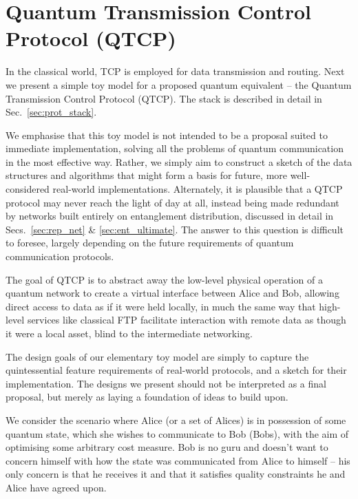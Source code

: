 %
%

\section{Quantum Transmission Control Protocol (QTCP)} \label{sec:QTCP}

In the classical world, TCP is employed for data transmission and routing. Next we present a simple toy model for a proposed quantum equivalent -- the Quantum Transmission Control Protocol (QTCP). The stack is described in detail in Sec.~\ref{sec:prot_stack}.

We emphasise that this toy model is not intended to be a proposal suited to immediate implementation, solving all the problems of quantum communication in the most effective way. Rather, we simply aim to construct a sketch of the data structures and algorithms that might form a basis for future, more well-considered real-world implementations. Alternately, it is plausible that a QTCP protocol may never reach the light of day at all, instead being made redundant by networks built entirely on entanglement distribution, discussed in detail in Secs.~\ref{sec:rep_net} \& \ref{sec:ent_ultimate}. The answer to this question is difficult to foresee, largely depending on the future requirements of quantum communication protocols.

The goal of QTCP is to abstract away the low-level physical operation of a quantum network to create a virtual interface between Alice and Bob, allowing direct access to data as if it were held locally, in much the same way that high-level services like classical FTP facilitate interaction with remote data as though it were a local asset, blind to the intermediate networking.

The design goals of our elementary toy model are simply to capture the quintessential feature requirements of real-world protocols, and a sketch for their implementation. The designs we present should not be interpreted as a final proposal, but merely as laying a foundation of ideas to build upon.

We consider the scenario where Alice (or a set of Alices) is in possession of some quantum state, which she wishes to communicate to Bob (Bobs), with the aim of optimising some arbitrary cost measure. Bob is no guru and doesn't want to concern himself with how the state was communicated from Alice to himself -- his only concern is that he receives it and that it satisfies quality constraints he and Alice have agreed upon.
 
